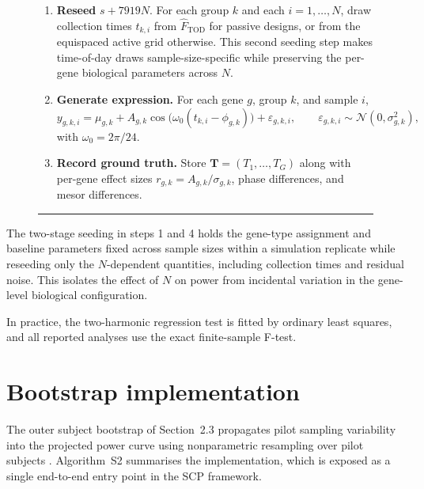 \documentclass{article}
\begin{document}
\begin{figure}[!htbp]
\begin{enumerate}
\item \textbf{Reseed} $s + 7919N$. For each group $k$ and each
$i=1,\ldots,N$, draw collection times $t_{k,i}$ from
$\hat{F}_{\mathrm{TOD}}$ for passive designs, or from the equispaced
active grid otherwise. This second seeding step makes time-of-day draws
sample-size-specific while preserving the per-gene biological parameters
across $N$.

\item \textbf{Generate expression.} For each gene $g$, group $k$, and
sample $i$,
\[
y_{g,k,i}
=
\mu_{g,k}
+
A_{g,k}
\cos\!\big(
\omega_0(t_{k,i}-\phi_{g,k})
\big)
+
\varepsilon_{g,k,i},
\qquad
\varepsilon_{g,k,i}
\sim
\mathcal{N}(0,\sigma_{g,k}^2),
\]
with $\omega_0=2\pi/24$.

\item \textbf{Record ground truth.} Store
$\mathbf{T}=(T_1,\ldots,T_G)$ along with per-gene effect sizes
$r_{g,k}=A_{g,k}/\sigma_{g,k}$, phase differences, and mesor
differences.

\end{enumerate}
\vspace{2pt}\hrule
\end{figure}

The two-stage seeding in steps 1 and 4 holds the gene-type assignment
and baseline parameters fixed across sample sizes within a simulation
replicate while reseeding only the $N$-dependent quantities, including
collection times and residual noise. This isolates the effect of $N$ on
power from incidental variation in the gene-level biological
configuration.

In practice, the two-harmonic regression test is fitted by ordinary
least squares, and all reported analyses use the exact finite-sample
F-test.


\section{Bootstrap implementation}
\label{sec:bootstrap_impl}

The outer subject bootstrap of Section~2.3 propagates pilot sampling
variability into the projected power curve using nonparametric resampling
over pilot subjects \citep{efron1979bootstrap}. Algorithm~S2 summarises
the implementation, which is exposed as a single end-to-end entry point
in the \textsc{SCP} framework.
\end{document}
